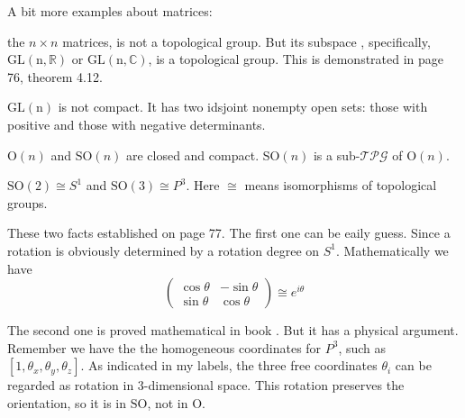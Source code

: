 \documentclass{article}
\begin{document}
A bit more examples about matrices:
\begin{ex}
     the $n\times n$ matrices, is not a
    topological group. But its subspace
    , specifically,
    $\mathrm{GL(n,\mathbb{R})}$ or $\mathrm{GL(n,\mathbb{C})}$, is a
    topological group. This is demonstrated in page 76, theorem 4.12.
\end{ex}
\begin{fact}
    $\mathrm{GL(n)}$ is not compact. It has two idsjoint nonempty open
    sets: those with positive and those with negative determinants.
\end{fact}
\begin{thm}
    $\mathrm{O}(n)$ and $\mathrm{SO}(n)$ are closed and compact.
    $\mathrm{SO}(n)$ is a sub-$\mathcal{TPG}$ of $\mathrm{O}(n)$.
\end{thm}
\begin{fact}
    $\mathrm{SO}(2)\cong S^1$ and $\mathrm{SO}(3)\cong P^3$.
    Here $\cong$ means isomorphisms of topological groups.
\end{fact}
\begin{remark}
    These two facts established on page 77. The first one can be eaily
    guess. Since a rotation is obviously determined by a rotation
    degree on $S^1$. Mathematically we have
    \begin{equation}
        \left(\begin{array} {cc}
            \cos\theta & -\sin\theta \\
            \sin\theta & \cos\theta 
        \end{array}\right) \cong e^{i\theta}
    \end{equation}

    The second one is proved mathematical in book \cite{book}. But it
    has a physical argument. Remember we have the the homogeneous
    coordinates for $P^3$, such as $[1,\theta_x,\theta_y,\theta_z]$.
    As indicated in my labels, the three free coordinates $\theta_i$
    can be regarded as rotation in 3-dimensional space. This rotation
    preserves the orientation, so it is in $\mathrm{SO}$, not in
    $\mathrm{O}$. 
\end{remark}
\end{document}
